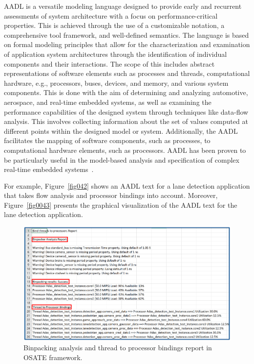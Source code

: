 AADL is a versatile modeling language designed to provide early and recurrent assessments of system architecture with a focus on performance-critical properties. This is achieved through the use of a customizable notation, a comprehensive tool framework, and well-defined semantics. The language is based on formal modeling principles that allow for the characterization and examination of application system architectures through the identification of individual components and their interactions.
The scope of this includes abstract representations of software elements such as processes and threads, computational hardware, e.g., processors, buses, devices, and memory, and various system components. This is done with the aim of determining and analyzing automotive, aerospace, and real-time embedded systems, as well as examining the performance capabilities of the designed system through techniques like data-flow analysis. This involves collecting information about the set of values computed at different points within the designed model or system.
Additionally, the AADL facilitates the mapping of software components, such as processes, to computational hardware elements, such as processors. AADL has been proven to be particularly useful in the model-based analysis and specification of complex real-time embedded systems~\cite{feiler2006architecture}. 

For example, Figure~\ref{fig042} shows an AADL text for a lane detection application that takes flow analysis and processor bindings into account. Moreover, Figure~\ref{fig0043} presents the graphical visualization of the AADL text for the lane detection application.
\begin{figure}[hb!]
\centering
\includegraphics[width=1\textwidth]{figures/binpacking_osate.pdf}
\caption{Binpacking analysis and thread to processor bindings report in OSATE framework.}
\label{fig044}
\end{figure}

